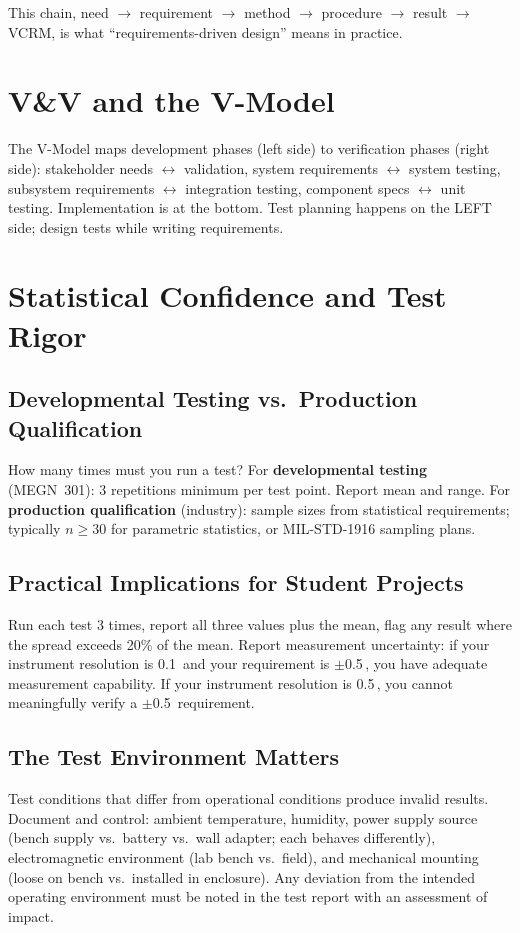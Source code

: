 This chain, need $\to$ requirement $\to$ method $\to$ procedure $\to$ result $\to$ VCRM, is what ``requirements-driven design'' means in practice.

\section{V\&V and the V-Model}
The V-Model maps development phases (left side) to verification phases (right side): stakeholder needs $\leftrightarrow$ validation, system requirements $\leftrightarrow$ system testing, subsystem requirements $\leftrightarrow$ integration testing, component specs $\leftrightarrow$ unit testing. Implementation is at the bottom. Test planning happens on the LEFT side; design tests while writing requirements.


\section{Statistical Confidence and Test Rigor}
\subsection{Developmental Testing vs.\ Production Qualification}
How many times must you run a test? For \textbf{developmental testing} (MEGN~301): 3 repetitions minimum per test point. Report mean and range. For \textbf{production qualification} (industry): sample sizes from statistical requirements; typically $n \geq 30$ for parametric statistics, or MIL-STD-1916 sampling plans.

\subsection{Practical Implications for Student Projects}
Run each test 3 times, report all three values plus the mean, flag any result where the spread exceeds 20\% of the mean. Report measurement uncertainty: if your instrument resolution is 0.1\,\degC{} and your requirement is $\pm$0.5\,\degC{}, you have adequate measurement capability. If your instrument resolution is 0.5\,\degC{}, you cannot meaningfully verify a $\pm$0.5\,\degC{} requirement.


\subsection{The Test Environment Matters}
Test conditions that differ from operational conditions produce invalid results. Document and control: ambient temperature, humidity, power supply source (bench supply vs.\ battery vs.\ wall adapter; each behaves differently), electromagnetic environment (lab bench vs.\ field), and mechanical mounting (loose on bench vs.\ installed in enclosure). Any deviation from the intended operating environment must be noted in the test report with an assessment of impact.


